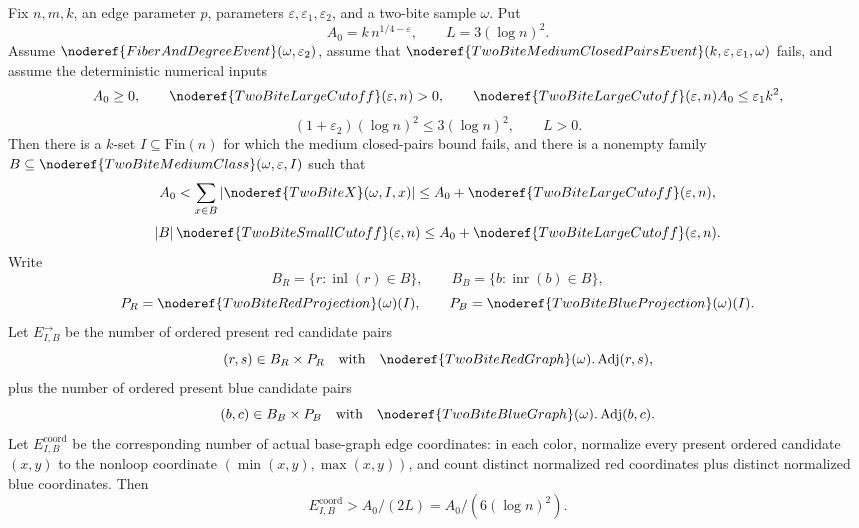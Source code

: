 \begin{helper}
Fix \(n,m,k\), an edge parameter \(p\), parameters
\(\varepsilon,\varepsilon_1,\varepsilon_2\), and a two-bite sample
\(\omega\).  Put
\[
A_0=k\,n^{1/4-\varepsilon},\qquad
L=3(\log n)^2.
\]
Assume \(\noderef{FiberAndDegreeEvent}(\omega,\varepsilon_2)\), assume that
\(\noderef{TwoBiteMediumClosedPairsEvent}(k,\varepsilon,\varepsilon_1,\omega)\)
fails, and assume the deterministic numerical inputs
\[
A_0\ge0,\qquad \noderef{TwoBiteLargeCutoff}(\varepsilon,n)>0,\qquad
\noderef{TwoBiteLargeCutoff}(\varepsilon,n)A_0
  \le \varepsilon_1 k^2,
\]
\[
(1+\varepsilon_2)(\log n)^2\le 3(\log n)^2,\qquad L>0 .
\]
Then there is a \(k\)-set \(I\subseteq \mathrm{Fin}(n)\) for which the medium
closed-pairs bound fails, and there is a nonempty family
\(B\subseteq \noderef{TwoBiteMediumClass}(\omega,\varepsilon,I)\) such that
\[
A_0<\sum_{x\in B}|\noderef{TwoBiteX}(\omega,I,x)|
\le A_0+\noderef{TwoBiteLargeCutoff}(\varepsilon,n),
\]
\[
|B|\,\noderef{TwoBiteSmallCutoff}(\varepsilon,n)
\le A_0+\noderef{TwoBiteLargeCutoff}(\varepsilon,n).
\]
Write
\[
B_R=\{r:\operatorname{inl}(r)\in B\},\qquad
B_B=\{b:\operatorname{inr}(b)\in B\},
\]
\[
P_R=\noderef{TwoBiteRedProjection}(\omega)(I),\qquad
P_B=\noderef{TwoBiteBlueProjection}(\omega)(I).
\]
Let \(E^\rightarrow_{I,B}\) be the number of ordered present red candidate
pairs
\[
(r,s)\in B_R\times P_R
\quad\text{with}\quad
\noderef{TwoBiteRedGraph}(\omega).\operatorname{Adj}(r,s),
\]
plus the number of ordered present blue candidate pairs
\[
(b,c)\in B_B\times P_B
\quad\text{with}\quad
\noderef{TwoBiteBlueGraph}(\omega).\operatorname{Adj}(b,c).
\]
Let \(E^{\mathrm{coord}}_{I,B}\) be the corresponding number of actual
base-graph edge coordinates: in each color, normalize every present ordered
candidate \((x,y)\) to the nonloop coordinate
\((\min(x,y),\max(x,y))\), and count distinct normalized red coordinates plus
distinct normalized blue coordinates.  Then
\[
E^{\mathrm{coord}}_{I,B}>A_0/(2L)=A_0/(6(\log n)^2).
\]
\end{helper}
